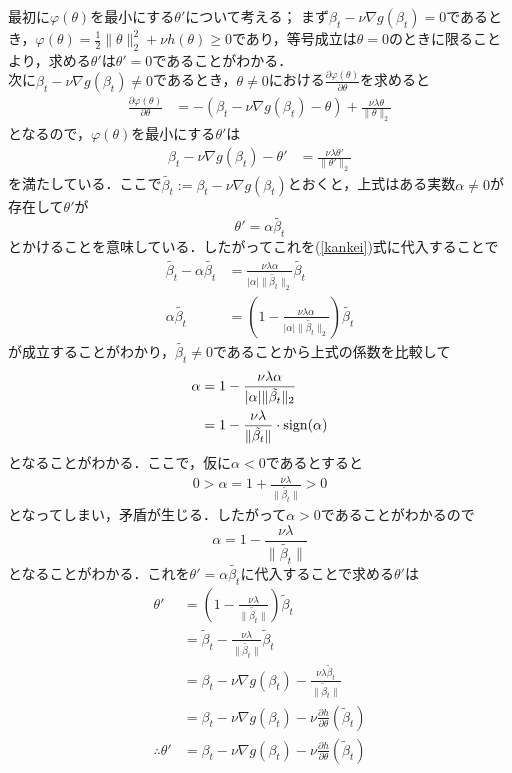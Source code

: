 \documentclass{jsarticle}
\theoremstyle{definition}
\theoremstyle{mystyle} %
\begin{document}
最初に$\varphi(\theta)$を最小にする$\theta'$について考える；
まず$\beta_t-\nu \nabla g(\beta_t)=0$であるとき，$\varphi(\theta)=\frac{1}{2}\|\theta\|_2^2+\nu h(\theta)\geq 0$であり，等号成立は$\theta=0$のときに限ることより，求める$\theta'$は$\theta'=0$であることがわかる．\\


次に$\beta_t-\nu \nabla g(\beta_t)\neq 0$であるとき，$\theta\neq 0$における$\displaystyle\frac{\partial \varphi(\theta)}{\partial \theta}$を求めると
\begin{align*}
\frac{\partial \varphi(\theta)}{\partial \theta}&=-(\beta_t-\nu\nabla g(\beta_t)-\theta)+\frac{\nu \lambda \theta}{\|\theta\|_2}
\end{align*}
となるので，$\varphi(\theta)$を最小にする$\theta'$は
\begin{align}
\label{kankei}
\beta_t-\nu\nabla g(\beta_t)-\theta'&=\frac{\nu \lambda \theta'}{\|\theta'\|_2}
\end{align}
を満たしている．ここで$\tilde{\beta_t}:=\beta_t-\nu \nabla g(\beta_t)$とおくと，上式はある実数$\alpha\neq 0$が存在して$\theta'$が
$$\theta' = \alpha \tilde{\beta_t}$$
とかけることを意味している．したがってこれを(\ref{kankei})式に代入することで
\begin{align*}
\tilde{\beta_t}-\alpha\tilde{\beta_t}&=\frac{\nu \lambda \alpha}{|\alpha|\|\tilde{\beta_t}\|_2}\tilde{\beta_t}\\
\alpha \tilde{\beta_t}&=\left(1-\frac{\nu \lambda \alpha}{|\alpha|\|\tilde{\beta_t}\|_2}\right)\tilde{\beta_t}
\end{align*}
が成立することがわかり，$\tilde{\beta_t}\neq 0$であることから上式の係数を比較して
\begin{align*}
\alpha&=1-\frac{\nu \lambda \alpha}{|\alpha|\|\tilde{\beta_t}\|_2}\\
&= 1-\frac{\nu\lambda}{\|\tilde{\beta_t}\|}\cdot{\rm sign}(\alpha)
\end{align*}
となることがわかる．ここで，仮に$\alpha<0$であるとすると
\begin{align*}
0>\alpha=1+\frac{\nu\lambda}{\|\tilde{\beta_t}\|}>0
\end{align*}
となってしまい，矛盾が生じる．したがって$\alpha>0$であることがわかるので
$$\alpha=1-\frac{\nu\lambda}{\|\tilde{\beta_t}\|}$$
となることがわかる．これを$\theta'=\alpha\tilde{\beta_t}$に代入することで求める$\theta'$は
\begin{align*}
\theta'&=\left(1-\frac{\nu\lambda}{\|\tilde{\beta_t}\|}\right)\tilde\beta_t\\
&=\tilde\beta_t-\frac{\nu\lambda}{\|\tilde{\beta_t}\|}\tilde\beta_t\\
&=\beta_t-\nu\nabla g(\beta_t)-\frac{\nu\lambda \tilde\beta_t}{\|\tilde\beta_t\|}\\
&=\beta_t-\nu\nabla g(\beta_t)-\nu \frac{\partial h}{\partial \theta}(\tilde \beta_t)\\
\therefore \theta' &= \beta_t-\nu\nabla g(\beta_t)-\nu \frac{\partial h}{\partial \theta}(\tilde \beta_t)
\end{align*}
\end{document}
